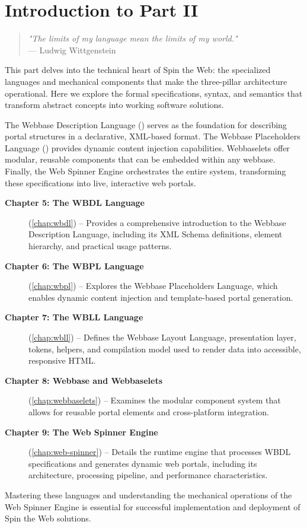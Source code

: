 
\chapter*{Introduction to Part II}
\label{part:languages}

\begin{quote}
\textit{"The limits of my language mean the limits of my world."} \\
— Ludwig Wittgenstein
\end{quote}

This part delves into the technical heart of Spin the Web: the specialized languages and mechanical components that make the three-pillar architecture operational. Here we explore the formal specifications, syntax, and semantics that transform abstract concepts into working software solutions.

The Webbase Description Language (\wbdl{}) serves as the foundation for describing portal structures in a declarative, XML-based format. The Webbase Placeholders Language (\wbpl{}) provides dynamic content injection capabilities. Webbaselets offer modular, reusable components that can be embedded within any webbase. Finally, the Web Spinner Engine orchestrates the entire system, transforming these specifications into live, interactive web portals.

\begin{description}
\item[\textbf{Chapter 5: The WBDL Language}] (\cref{chap:wbdl}) -- Provides a comprehensive introduction to the Webbase Description Language, including its XML Schema definitions, element hierarchy, and practical usage patterns.

\item[\textbf{Chapter 6: The WBPL Language}] (\cref{chap:wbpl}) -- Explores the Webbase Placeholders Language, which enables dynamic content injection and template-based portal generation.

\item[\textbf{Chapter 7: The WBLL Language}] (\cref{chap:wbll}) -- Defines the Webbase Layout Language, presentation layer, tokens, helpers, and compilation model used to render data into accessible, responsive HTML.

\item[\textbf{Chapter 8: Webbase and Webbaselets}] (\cref{chap:webbaselets}) -- Examines the modular component system that allows for reusable portal elements and cross-platform integration.

\item[\textbf{Chapter 9: The Web Spinner Engine}] (\cref{chap:web-spinner}) -- Details the runtime engine that processes WBDL specifications and generates dynamic web portals, including its architecture, processing pipeline, and performance characteristics.
\end{description}

Mastering these languages and understanding the mechanical operations of the Web Spinner Engine is essential for successful implementation and deployment of Spin the Web solutions.
